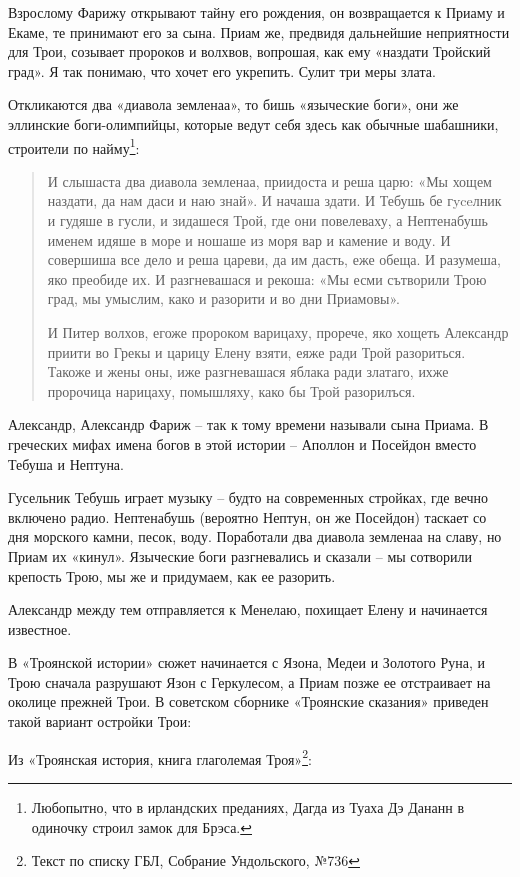 Взрослому Фарижу открывают тайну его рождения, он возвращается к Приаму и Екаме, те принимают его за сына. Приам же, предвидя дальнейшие неприятности для Трои, созывает пророков и волхвов, вопрошая, как ему «наздати Тройский град». Я так понимаю, что хочет его укрепить. Сулит три меры злата.

Откликаются два «диавола земленаа», то бишь «языческие боги», они же эллинские боги-олимпийцы, которые ведут себя здесь как обычные шабашники, строители по найму\footnote{Любопытно, что в ирландских преданиях, Дагда из Туаха Дэ Дананн в одиночку строил замок для Брэса.}:

\begin{quotation}
И слышаста два диавола земленаа, приидоста и реша царю: «Мы хощем наздати, да нам даси и наю знай». И начаша здати. И Тебушь бе гyceлник и гудяше в гусли, и зидашеся Трой, где они повелеваху, а Неп­тенабушь именем идяше в море и ношаше из моря вар и камение и воду. И совершиша все дело и реша цареви, да им дасть, еже обеща. И разумеша, яко преобиде их. И разгневашася и рекоша: «Мы есми сътворили Трою град, мы умыслим, како и разорити и во дни Приамовы».

И Питер волхов, егоже пророком варицаху, прорече, яко хощеть Александр приити во Грекы и царицу Елену взяти, еяже ради Трой разориться. Такоже и жены оны, иже разгневашася яблака ради златаго, ихже пророчица нарицаху, помышляху, како бы Трой разорилъся.
\end{quotation}

Александр, Александр Фариж – так к тому времени называли сына Приама. В греческих мифах имена богов в этой истории – Аполлон и Посейдон вместо Тебуша и Нептуна.

Гусельник Тебушь играет музыку – будто на современных стройках, где вечно включено радио. Нептенабушь (вероятно Нептун, он же Посейдон) таскает со дня морского камни, песок, воду. Поработали два диавола земленаа на славу, но Приам их «кинул». Языческие боги разгневались и сказали – мы сотворили крепость Трою, мы же и придумаем, как ее разорить.

Александр между тем отправляется к Менелаю, похищает Елену и начинается известное.

В «Троянской истории» сюжет начинается с Язона, Медеи и Золотого Руна, и Трою сначала разрушают Язон с Геркулесом, а Приам позже ее отстраивает на околице прежней Трои. В советском сборнике «Троянские сказания»\cite{troyaskaz} приведен такой вариант остройки Трои:

Из «Троянская история, книга глаголемая Троя»\footnote{Текст по списку ГБЛ, Собрание Ундольского, №736}:

